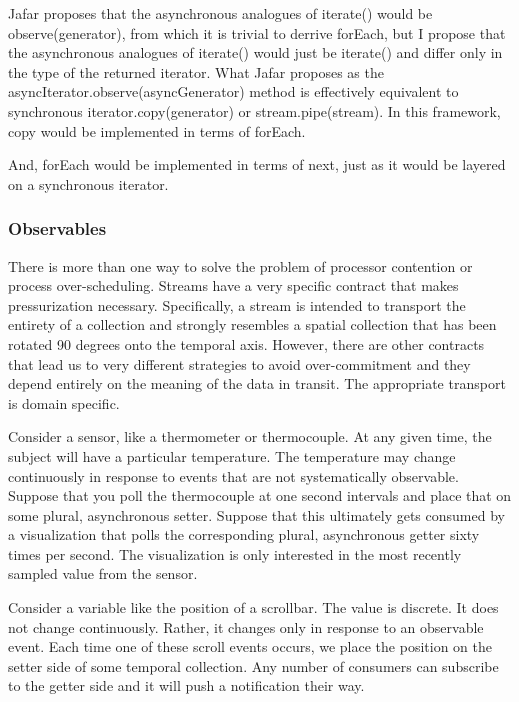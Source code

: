 Jafar proposes that the asynchronous analogues of iterate() would be observe(generator), from which it is trivial to derrive forEach, but I propose that the asynchronous analogues of iterate() would just be iterate() and differ only in the type of the returned iterator. What Jafar proposes as the asyncIterator.observe(asyncGenerator) method is effectively equivalent to synchronous iterator.copy(generator) or stream.pipe(stream). In this framework, copy would be implemented in terms of forEach.

And, forEach would be implemented in terms of next, just as it would be layered on a synchronous iterator.

\subsubsection{Observables}

There is more than one way to solve the problem of processor contention or process over-scheduling. Streams have a very specific contract that makes pressurization necessary. Specifically, a stream is intended to transport the entirety of a collection and strongly resembles a spatial collection that has been rotated 90 degrees onto the temporal axis. However, there are other contracts that lead us to very different strategies to avoid over-commitment and they depend entirely on the meaning of the data in transit. The appropriate transport is domain specific.

Consider a sensor, like a thermometer or thermocouple. At any given time, the subject will have a particular temperature. The temperature may change continuously in response to events that are not systematically observable. Suppose that you poll the thermocouple at one second intervals and place that on some plural, asynchronous setter. Suppose that this ultimately gets consumed by a visualization that polls the corresponding plural, asynchronous getter sixty times per second. The visualization is only interested in the most recently sampled value from the sensor.

Consider a variable like the position of a scrollbar. The value is discrete. It does not change continuously. Rather, it changes only in response to an observable event. Each time one of these scroll events occurs, we place the position on the setter side of some temporal collection. Any number of consumers can subscribe to the getter side and it will push a notification their way.

